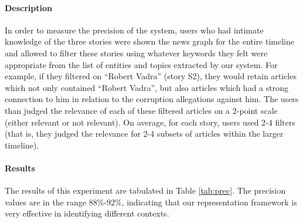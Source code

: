 \normalsize

\paragraph*{Description} In order to measure the precision of the system, users who had intimate knowledge of the three stories were shown the news graph for the entire timeline and allowed to filter these stories using whatever keywords they felt were appropriate from the list of entities and topics extracted by our system. For example, if they filtered on ``Robert Vadra'' (story S2), they would retain articles which not only contained ``Robert Vadra'', but also articles which had a strong connection to him in relation to the corruption allegations against him. The users than judged the relevance of each of these filtered articles on a 2-point scale (either relevant or not relevant). On average, for each story, users used 2-4 filters (that is, they judged the relevance for 2-4 subsets of articles within the larger timeline).

\paragraph*{Results} The results of this experiment are tabulated in Table \ref{tab:prec}. The precision values are in the range 88\%-92\%, indicating that our representation framework is very effective in identifying different contexts.


